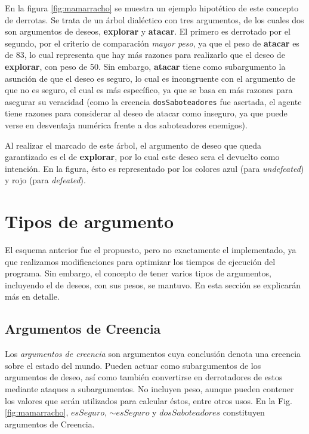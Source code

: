 \documentclass[oneside]{book}
\theoremstyle{definition}
\newcommand{\no}{\mbox{$\sim$}}
\newcommand{\lit}[1]{\mbox{$ #1$}}
\begin{document}
En la figura \ref{fig:mamarracho} se muestra un ejemplo hipotético de este 
concepto de derrotas. Se 
trata de un árbol dialéctico con tres argumentos, de los cuales dos son
argumentos de deseos, \textbf{explorar} y \textbf{atacar}. El primero es
derrotado por el segundo, por el criterio de comparación \textit{mayor peso},
ya que el peso de \textbf{atacar} es de 83, lo cual representa que hay más 
razones para realizarlo que el deseo de \textbf{explorar}, con peso de 50. Sin
embargo, \textbf{atacar} tiene como subargumento la asunción de que el deseo es
seguro, lo cual es incongruente con el argumento de que no es seguro, el cual 
es más específico, ya que se basa en más razones para asegurar su veracidad 
(como la creencia \texttt{dosSaboteadores} fue asertada, el agente tiene 
razones para considerar al deseo de atacar como inseguro, ya que puede verse
en desventaja numérica frente a dos saboteadores enemigos).

Al realizar el marcado de este árbol, el argumento de deseo que queda 
garantizado es el de \textbf{explorar}, por lo cual este deseo sera el devuelto
como intención. En la figura, ésto es representado por los colores azul (para
\textit{undefeated}) y rojo (para \textit{defeated}).


\section{Tipos de argumento}

\label{sec:tiposArgumento}


El esquema anterior fue el propuesto, pero no exactamente el implementado, ya que
realizamos modificaciones para optimizar los tiempos de ejecución del programa. Sin 
embargo, el concepto de tener varios tipos de argumentos, incluyendo el de deseos, con sus
pesos, se mantuvo. En esta sección se explicarán más en detalle.

\subsection{Argumentos de Creencia}

\label{sec:argumentosSoporte}

Los \textit{argumentos de creencia} son argumentos cuya conclusión denota una creencia 
sobre el estado del mundo. Pueden actuar como subargumentos de los argumentos
de deseo, así como también convertirse en derrotadores de estos mediante ataques a 
subargumentos. No incluyen peso, aunque pueden contener los valores que serán utilizados 
para calcular éstos, entre otros usos. En la Fig. \ref{fig:mamarracho}, \lit{esSeguro}, 
\lit{\no esSeguro} y \lit{dosSaboteadores} constituyen argumentos de Creencia.
\end{document}
